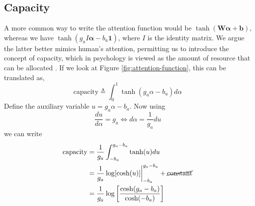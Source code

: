 \subsection*{Capacity}
A more common way to write the attention function would be $\tanh(\mathbf{W}\bm{\alpha}+\mathbf{b})$, whereas we have $\tanh(g_a I\bm{\alpha}-b_a\mathbf{1})$, where $I$ is the identity matrix. We argue the latter better mimics human's attention, permitting us to introduce the concept of capacity, which in psychology is viewed as the amount of resource that can be allocated \citep{attention-is-effort}. If we look at Figure \ref{fig:attention-function}, this can be translated as,
\begin{equation}
\text{capacity} \triangleq \int_0^1 \tanh(g_a\alpha - b_a)d\alpha 
\end{equation}
Define the auxiliary variable $u = g_a\alpha - b_a$. Now using
\begin{equation}
\frac{du}{d\alpha} = g_a \Leftrightarrow d\alpha = \frac{1}{g_a}du
\end{equation}
we can write 
\begin{equation}
\begin{split}
\text{capacity} &= \frac{1}{g_a} \int_{-b_a}^{g_a-b_a} \tanh(u)du  \\
&= \frac{1}{g_a}\log[\cosh(u)]\bigg\rvert_{-b_a}^{g_a-b_a} + \cancel{\text{constant}} \\
&= \frac{1}{g_a}\log\bigg[\frac{\cosh(g_a - b_a)}{\cosh(-b_a)}\bigg]
\end{split}
\label{eq:capacity}
\end{equation}
